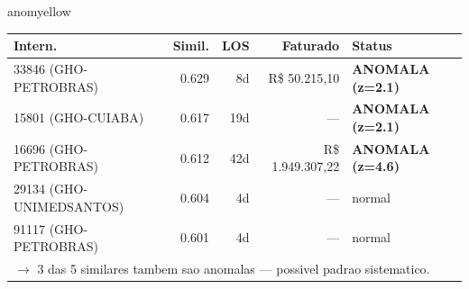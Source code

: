 \documentclass[a4paper,10pt]{article}
\begin{document}
\begin{anomalycard}[Internacao 164039 | GHO-PETROBRAS | MODERADO (z=2.06)]{anomyellow}
\begin{tabular}{l r r r l}\toprule\textbf{Intern.} & \textbf{Simil.} & \textbf{LOS} & \textbf{Faturado} & \textbf{Status} \\\midrule
33846 (GHO-PETROBRAS) & 0.629 & 8d & R\$ 50.215,10 & \textcolor{anomred}{\textbf{ANOMALA (z=2.1)}} \\
15801 (GHO-CUIABA) & 0.617 & 19d & --- & \textcolor{anomred}{\textbf{ANOMALA (z=2.1)}} \\
16696 (GHO-PETROBRAS) & 0.612 & 42d & R\$ 1.949.307,22 & \textcolor{anomred}{\textbf{ANOMALA (z=4.6)}} \\
29134 (GHO-UNIMEDSANTOS) & 0.604 & 4d & --- & \textcolor{jcubeblue}{normal} \\
91117 (GHO-PETROBRAS) & 0.601 & 4d & --- & \textcolor{jcubeblue}{normal} \\
\multicolumn{5}{l}{\textcolor{anomred}{\small $\rightarrow$ 3 das 5 similares tambem sao anomalas --- possivel padrao sistematico.}} \\
\bottomrule\end{tabular}



\end{anomalycard}

\newpage
\end{document}
